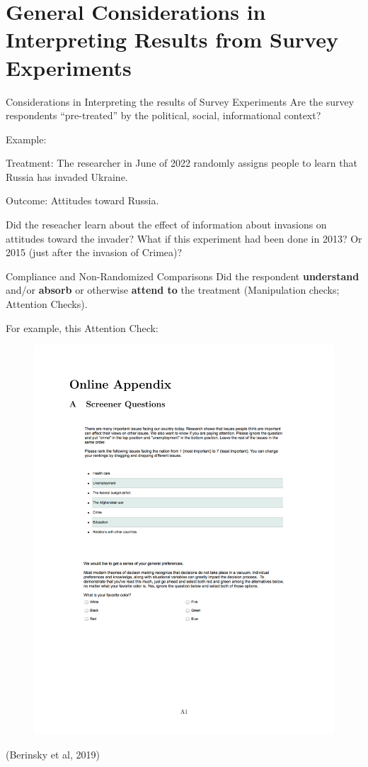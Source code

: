 \documentclass[
  ignorenonframetext,
]{beamer}
\begin{document}
\hypertarget{general-considerations-in-interpreting-results-from-survey-experiments}{%
\section{General Considerations in Interpreting Results from Survey
Experiments}\label{general-considerations-in-interpreting-results-from-survey-experiments}}

\begin{frame}{Considerations in Interpreting the results of Survey
Experiments}
\protect\hypertarget{considerations-in-interpreting-the-results-of-survey-experiments}{}
Are the survey respondents ``pre-treated'' by the political, social,
informational context?

Example:

Treatment: The researcher in June of 2022 randomly assigns people to
learn that Russia has invaded Ukraine.

Outcome: Attitudes toward Russia.

Did the reseacher learn about the effect of information about invasions
on attitudes toward the invader? What if this experiment had been done
in 2013? Or 2015 (just after the invasion of Crimea)?
\end{frame}

\begin{frame}{Compliance and Non-Randomized Comparisons}
\protect\hypertarget{compliance-and-non-randomized-comparisons}{}
Did the respondent \textbf{understand} and/or \textbf{absorb} or
otherwise \textbf{attend to} the treatment (Manipulation checks;
Attention Checks).

For example, this Attention Check:

\begin{figure}

{\centering \includegraphics[width=0.7\linewidth]{./figs/survey-exp-berinsky_2019} 

}

\end{figure}

(Berinsky et al, 2019)
\end{frame}
\end{document}
